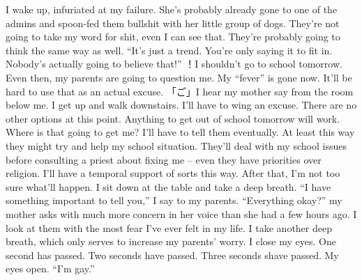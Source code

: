 \documentclass[a4paper, 12pt]{book}
\begin{document}
\begin{CJK*}{UTF8}{min}
I wake up, infuriated at my failure. She’s probably already gone to one of the admins and spoon-fed them bullshit with her little group of dogs. They’re not going to take my word for shit, even I can see that. They’re probably going to think the same way as well. ``It’s just a trend. You’re only saying it to fit in. Nobody’s actually going to believe that!'' ！I shouldn’t go to school tomorrow. Even then, my parents are going to question me. My ``fever'' is gone now. It’ll be hard to use that as an actual excuse.
\newline
\tab
「ご」I hear my mother say from the room below me. I get up and walk downstairs. I’ll have to wing an excuse. There are no other options at this point. Anything to get out of school tomorrow will work. Where is that going to get me? I’ll have to tell them eventually. At least this way they might try and help my school situation. They’ll deal with my school issues before consulting a priest about fixing me -- even they have priorities over religion. I’ll have a temporal support of sorts this way. After that, I’m not too sure what’ll happen.
\newline
\tab
I sit down at the table and take a deep breath. ``I have something important to tell you,'' I say to my parents.
\newline
\tab
``Everything okay?'' my mother asks with much more concern in her voice than she had a few hours ago. 
\newline
\tab
I look at them with the most fear I’ve ever felt in my life. I take another deep breath, which only serves to increase my parents’ worry. I close my eyes. One second has passed. Two seconds have passed. Three seconds shave passed. My eyes open. ``I’m gay.''
\end{CJK*}
\end{document}
